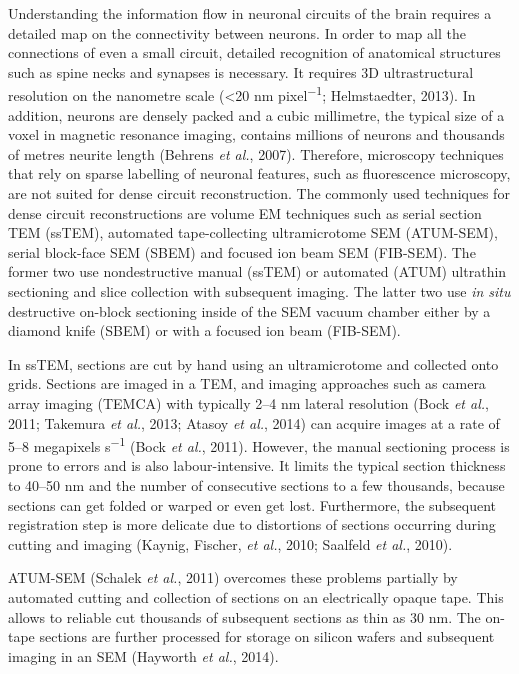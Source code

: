\documentclass{article}
\begin{document}
Understanding the information flow in neuronal circuits of the brain requires a detailed map on the connectivity between neurons. In order to map all the connections of even a small circuit, detailed recognition of anatomical structures such as spine necks and synapses is necessary. It requires 3D ultrastructural resolution on the nanometre scale (<20 nm pixel\textsuperscript{−1}; Helmstaedter, 2013). In addition, neurons are densely packed and a cubic millimetre, the typical size of a voxel in magnetic resonance imaging, contains millions of neurons and thousands of metres neurite length (Behrens \emph{et al.}, 2007). Therefore, microscopy techniques that rely on sparse labelling of neuronal features, such as fluorescence microscopy, are not suited for dense circuit reconstruction. The commonly used techniques for dense circuit reconstructions are volume EM techniques such as serial section TEM (ssTEM), automated tape-collecting ultramicrotome SEM (ATUM-SEM), serial block-face SEM (SBEM) and focused ion beam SEM (FIB-SEM). The former two use nondestructive manual (ssTEM) or automated (ATUM) ultrathin sectioning and slice collection with subsequent imaging. The latter two use \emph{in situ} destructive on-block sectioning inside of the SEM vacuum chamber either by a diamond knife (SBEM) or with a focused ion beam (FIB-SEM).

In ssTEM, sections are cut by hand using an ultramicrotome and collected onto grids. Sections are imaged in a TEM, and imaging approaches such as camera array imaging (TEMCA) with typically 2–4 nm lateral resolution (Bock \emph{et al.}, 2011; Takemura \emph{et al.}, 2013; Atasoy \emph{et al.}, 2014) can acquire images at a rate of 5–8 megapixels s\textsuperscript{−1} (Bock \emph{et al.}, 2011). However, the manual sectioning process is prone to errors and is also labour-intensive. It limits the typical section thickness to 40–50 nm and the number of consecutive sections to a few thousands, because sections can get folded or warped or even get lost. Furthermore, the subsequent registration step is more delicate due to distortions of sections occurring during cutting and imaging (Kaynig, Fischer, \emph{et al.}, 2010; Saalfeld \emph{et al.}, 2010).

ATUM-SEM (Schalek \emph{et al.}, 2011) overcomes these problems partially by automated cutting and collection of sections on an electrically opaque tape. This allows to reliable cut thousands of subsequent sections as thin as 30 nm. The on-tape sections are further processed for storage on silicon wafers and subsequent imaging in an SEM (Hayworth \emph{et al.}, 2014).
\end{document}
